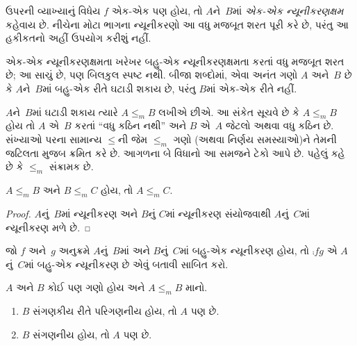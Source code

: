 ઉપરની વ્યાખ્યાનું વિધેય $f$ એક-એક પણ હોય, તો $A$ને~$B$માં
\emph{એક-એક ન્યૂનીકરણક્ષમ} કહેવાય છે. નીચેના મોટા ભાગના
ન્યૂનીકરણો આ વધુ મજબૂત શરત પૂરી કરે છે, પરંતુ આ હકીકતનો
અહીં ઉપયોગ કરીશું નહીં.

\begin{digress}
એક-એક ન્યૂનીકરણક્ષમતા ખરેખર બહુ-એક ન્યૂનીકરણક્ષમતા કરતાં
વધુ મજબૂત શરત છે; આ સાચું છે, પણ બિલકુલ સ્પષ્ટ નથી.
બીજા શબ્દોમાં, એવા અનંત ગણો $A$ અને~$B$ છે કે $A$ને~$B$માં
બહુ-એક રીતે ઘટાડી શકાય છે, પરંતુ $B$માં એક-એક રીતે નહીં.
\end{digress}
\endgroup


\begingroup
\makeatletter{}\makeatother

\label{guunit:OLP-0244}


$A$ને~$B$માં ઘટાડી શકાય ત્યારે $A \leq_m B$ લખીએ છીએ. આ
સંકેત સૂચવે છે કે $A \leq_m B$ હોય તો $A$ એ~$B$ કરતાં
``વધુ કઠિન નથી'' અને $B$ એ~$A$ જેટલો અથવા વધુ કઠિન છે.
સંખ્યાઓ પરના સામાન્ય $\le$ની જેમ $\le_m$ ગણો (અથવા
નિર્ણય સમસ્યાઓ)ને તેમની જટિલતા મુજબ ક્રમિત કરે છે.
આગળના બે વિધાનો આ સમજને ટેકો આપે છે. પહેલું કહે છે કે
$\le_m$ સંક્રામક છે.

\begin{prop}
$A \leq_m B$ અને $B \leq_m C$ હોય, તો $A \leq_m C$.
\end{prop}

\begin{proof}
$A$નું~$B$માં ન્યૂનીકરણ અને $B$નું $C$માં ન્યૂનીકરણ
સંયોજવાથી $A$નું~$C$માં ન્યૂનીકરણ મળે છે.
\end{proof}

\begin{prob}
જો $f$ અને~$g$ અનુક્રમે $A$નું~$B$માં અને $B$નું~$C$માં
બહુ-એક ન્યૂનીકરણ હોય, તો $\comp{f}{g}$ એ $A$નું~$C$માં
બહુ-એક ન્યૂનીકરણ છે એવું બતાવી 
સાબિત કરો.
\end{prob}

\begin{prop}
$A$ અને $B$ કોઈ પણ ગણો હોય અને $A \leq_m B$ માનો.
\begin{enumerate}
\item $B$ સંગણકીય રીતે પરિગણનીય હોય, તો $A$ પણ છે.
\item $B$ સંગણનીય હોય, તો $A$ પણ છે.
\end{enumerate}
\end{prop}

